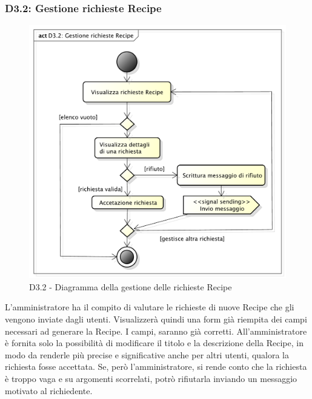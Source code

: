 		\subsubsection{D3.2: Gestione richieste Recipe} %
		\label{ssub:gestione_richieste_recipe}
		\begin{figure}[!htbp]
			\centering
			\centerline{\includegraphics[scale=0.45]{./images/D3_2.pdf}}
			\caption{D3.2 - Diagramma della gestione delle richieste Recipe}
		\end{figure}
		\noindent
		L'amministratore ha il compito di valutare le richieste di nuove Recipe che gli vengono inviate dagli utenti. Visualizzerà quindi una form già riempita dei campi necessari ad generare la Recipe. I campi, saranno già corretti. All'amministratore è fornita solo la possibilità di modificare il titolo e la descrizione della Recipe, in modo da renderle più precise e significative anche per altri utenti, qualora la richiesta fosse accettata. \newline
		Se, però l'amministratore, si rende conto che la richiesta è troppo vaga e su argomenti scorrelati, potrò rifiutarla inviando un messaggio motivato al richiedente.

		\pagebreak

